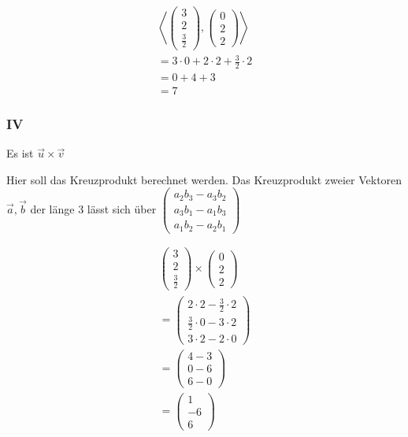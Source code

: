 \begin{align*}
    \left\langle \begin{pmatrix}
        3 \\ 2 \\ \frac{3}{2}
    \end{pmatrix}, \begin{pmatrix}
        0 \\ 2 \\ 2
    \end{pmatrix}\right\rangle \\
    = 3 \cdot 0 + 2 \cdot 2 + \frac{3}{2} \cdot 2 \\
    = 0 + 4 + 3 \\
    = 7
\end{align*}

\subsubsection{IV}
Es ist $\vec{u} \times \vec{v}$

Hier soll das Kreuzprodukt berechnet werden. Das Kreuzprodukt zweier Vektoren $\vec{a}, \vec{b}$ der länge 3 lässt sich 
über $\begin{pmatrix}a_2b_3 - a_3b_2 \\ a_3b_1 - a_1b_3 \\ a_1b_2 - a_2b_1 \end{pmatrix}$

\begin{align*}
    \begin{pmatrix}
        3 \\ 2 \\ \frac{3}{2}
    \end{pmatrix} \times \begin{pmatrix}
        0 \\ 2 \\2
    \end{pmatrix} \\
    = \begin{pmatrix}
        2 \cdot 2 - \frac{3}{2} \cdot 2 \\ \frac{3}{2} \cdot 0 - 3 \cdot 2 \\ 3 \cdot 2 - 2 \cdot 0
    \end{pmatrix} \\
    = \begin{pmatrix}
        4 - 3 \\ 0 - 6 \\ 6 - 0
    \end{pmatrix} \\
    = \begin{pmatrix}
        1 \\ -6 \\ 6
    \end{pmatrix}
\end{align*}

